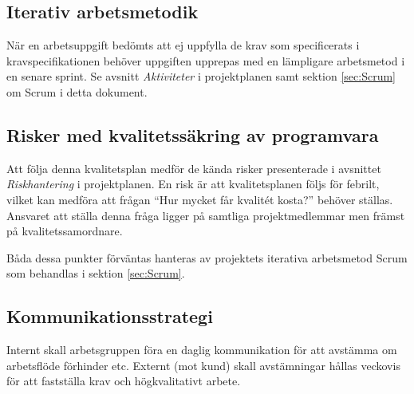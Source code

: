 \documentclass[a4paper,10pt]{article}
\begin{document}
\subsection{Iterativ arbetsmetodik}
När en arbetsuppgift bedömts att ej uppfylla de krav som specificerats i kravspecifikationen behöver uppgiften upprepas med en lämpligare arbetsmetod i en senare sprint. Se avsnitt \emph{Aktiviteter} i projektplanen samt sektion \ref{sec:Scrum} om Scrum i detta dokument.

\subsection{Risker med kvalitetssäkring av programvara}
Att följa denna kvalitetsplan medför de kända risker presenterade i avsnittet \emph{Riskhantering} i projektplanen. En risk är att kvalitetsplanen följs för febrilt, vilket kan medföra att frågan “Hur mycket får kvalitét kosta?” behöver ställas. Ansvaret att ställa denna fråga ligger på samtliga projektmedlemmar men främst på kvalitetssamordnare.

Båda dessa punkter förväntas hanteras av projektets iterativa arbetsmetod Scrum som behandlas i sektion \ref{sec:Scrum}.

\subsection{Kommunikationsstrategi}
Internt skall arbetsgruppen föra en daglig kommunikation för att avstämma om arbetsflöde förhinder etc.
Externt (mot kund) skall avstämningar hållas veckovis för att fastställa krav och högkvalitativt arbete.
\end{document}
